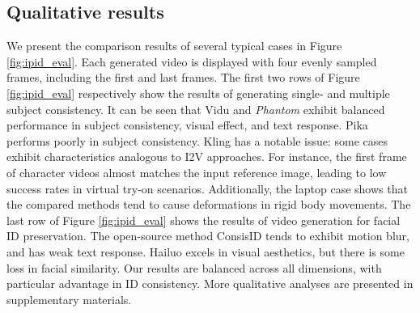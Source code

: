 \begin{table}[t]
	\centering
	\caption{Comparison of different methods based on single subject consistency and prompt following. \textbf{Boldface} indicates the highest scores in each column, and \underline{underline} indicates the second-highest scores.}
	\label{tab:ip_eval}
\end{table}


\subsection{Qualitative results}
\label{sec:exp:qual}

We present the comparison results of several typical cases in Figure \ref{fig:ipid_eval}. Each generated video is displayed with four evenly sampled frames, including the first and last frames. The first two rows of Figure \ref{fig:ipid_eval}  respectively show the results of generating single- and multiple subject consistency. It can be seen that Vidu \cite{Vidu} and \textit{Phantom} exhibit balanced performance in subject consistency, visual effect, and text response. Pika \cite{Pika} performs poorly in subject consistency. Kling \cite{Keling} has a notable issue: some cases exhibit characteristics analogous to I2V approaches. For instance, the first frame of character videos almost matches the input reference image, leading to low success rates in virtual try-on scenarios. Additionally, the laptop case shows that the compared methods tend to cause deformations in rigid body movements. The last row of Figure \ref{fig:ipid_eval} shows the results of video generation for facial ID preservation. The open-source method ConsisID \cite{yuan2024identity} tends to exhibit motion blur, and has weak text response. Hailuo \cite{Hailuo} excels in visual aesthetics, but there is some loss in facial similarity. Our results are balanced across all dimensions, with particular advantage in ID consistency. More qualitative analyses are presented in supplementary materials.

